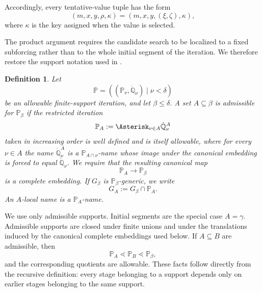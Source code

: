 \documentclass[a4paper,11pt]{article}
\newtheorem{definition}[theorem]{Definition}
\newcommand{\forceP}{\mathbb{P}}
\newcommand{\forceQ}{\mathbb{Q}}
\begin{document}
Accordingly, every tentative-value tuple has the form
\[
(m,x,y,\rho,\kappa)
=(m,x,y,(\xi,\zeta),\kappa),
\]
where $\kappa$ is the key assigned when the value is selected.

The product argument requires the candidate search to be localized to a fixed subforcing rather than to the whole initial segment of the iteration. We therefore restore the support notation used in \cite{Uniformization}.

\begin{definition}\label{AdmissibleSupportUniformization}
Let
\[
\forceP=((\forceP_\nu,\dot{\forceQ}_\nu)\mid\nu<\delta)
\]
be an allowable finite-support iteration, and let $\beta\leq\delta$. A set $A\subseteq\beta$ is \emph{admissible for $\forceP_\beta$} if the restricted iteration
\[
\forceP_A:=\Asterisk_{\nu\in A}\dot{\forceQ}^{A}_\nu
\]
taken in increasing order is well defined and is itself allowable, where for every $\nu\in A$ the name $\dot{\forceQ}^{A}_\nu$ is a $\forceP_{A\cap\nu}$-name whose image under the canonical embedding is forced to equal $\dot{\forceQ}_\nu$. We require that the resulting canonical map
\[
\forceP_A\longrightarrow\forceP_\beta
\]
is a complete embedding. If $G_\beta$ is $\forceP_\beta$-generic, we write
\[
G_A:=G_\beta\cap\forceP_A.
\]
An \emph{$A$-local name} is a $\forceP_A$-name.
\end{definition}

We use only admissible supports. Initial segments are the special case $A=\gamma$. Admissible supports are closed under finite unions and under the translations induced by the canonical complete embeddings used below. If $A\subseteq B$ are admissible, then
\[
\forceP_A\lessdot\forceP_B\lessdot\forceP_\beta,
\]
and the corresponding quotients are allowable. These facts follow directly from the recursive definition: every stage belonging to a support depends only on earlier stages belonging to the same support.
\end{document}
